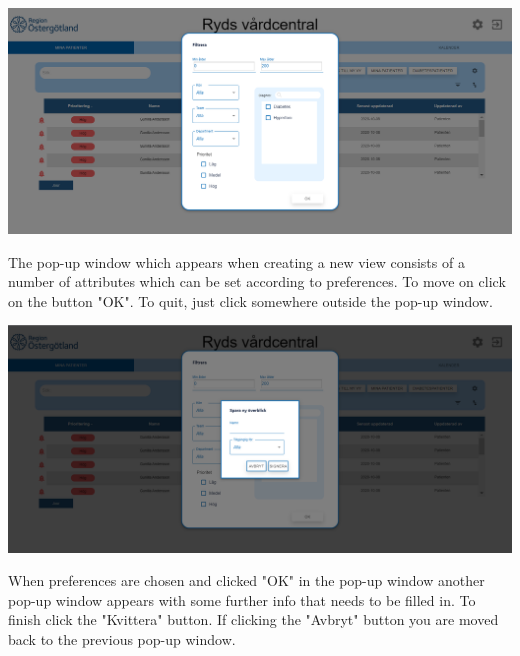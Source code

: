 \begin{center}
    \includegraphics[width=\linewidth]{images/Add_new_view_image.png}
    \label{fig:figures}
\end{center}
The pop-up window which appears when creating a new view consists of a number of attributes which can be set according to preferences. To move on click on the button "OK". To quit, just click somewhere outside the pop-up window.
\\
\begin{center}
    \includegraphics[width=\linewidth]{images/Save_new_view_image.png}
    \label{fig:figures}
\end{center}
When preferences are chosen and clicked "OK" in the pop-up window another pop-up window appears with some further info that needs to be filled in. To finish click the "Kvittera" button. If clicking the "Avbryt" button you are moved back to the previous pop-up window.
\\
